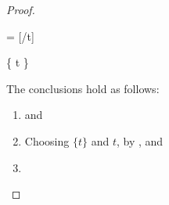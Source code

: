 \begin{proof}
\begin{byCases}
\begin{pfsteps}
  \item \tau = [\tau/t]\tau {} 
  \item {} \subset \Delta \cup \{ t \}  
  \end{pfsteps}
  The conclusions hold as follows:
  \begin{enumerate}
    \item {} and 
    \item Choosing $\{t\}$ and $t$, by ,  and 
    \item {}
  \end{enumerate}
  \resetpfcounter
\end{byCases}
\end{proof}

